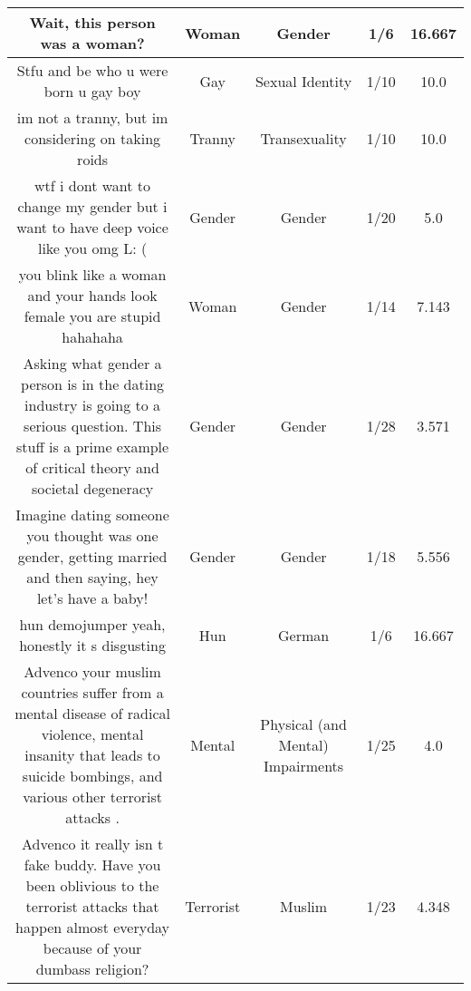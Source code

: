 \documentclass[11pt]{article}
\newlength\mylength
\begin{document}
\begin{center}
\begin{longtable}{|C{.40\mylength}|C{.30\mylength}|C{.15\mylength}|C{.15\mylength}|C{.15\mylength}|}
  Wait, this person was a woman?  & Woman & Gender & 1/6 & 16.667 \\  \hline
  Stfu and be who u were born u gay boy  & Gay & Sexual Identity & 1/10 & 10.0 \\  \hline
  im not a tranny, but im considering on taking roids  & Tranny & Transexuality & 1/10 & 10.0 \\  \hline
  wtf i dont want to change my gender but i want to have deep voice like you omg L:  (  & Gender & Gender & 1/20 & 5.0 \\  \hline
  you blink like a woman and your hands look female you are stupid hahahaha  & Woman & Gender & 1/14 & 7.143 \\  \hline
  Asking what gender a person is in the dating industry is going to a serious question. This stuff is a prime example of critical theory and societal degeneracy  & Gender & Gender & 1/28 & 3.571 \\  \hline
  Imagine dating someone you thought was one gender, getting married and then saying,  hey let's have a baby!   & Gender & Gender & 1/18 & 5.556 \\  \hline
  hun demojumper yeah, honestly it s disgusting  & Hun & German & 1/6 & 16.667 \\  \hline
  Advenco your muslim countries suffer from a mental disease of radical violence, mental insanity that leads to suicide bombings, and various other terrorist attacks .  & Mental & Physical (and Mental) Impairments & 1/25 & 4.0 \\  \hline
  Advenco it really isn t fake buddy. Have you been oblivious to the terrorist attacks that happen almost everyday because of your dumbass religion?  & Terrorist & Muslim & 1/23 & 4.348 \\  \hline

\end{longtable}
\end{center}
\end{document}
